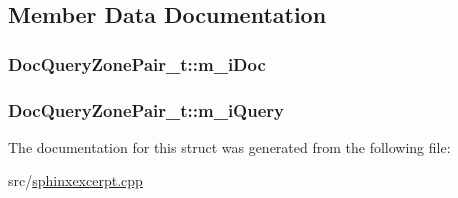 \subsection{Member Data Documentation}
\hypertarget{structDocQueryZonePair__t_aba3efaff10591a3a83afe5f93e248572}{
\subsubsection[{m\-\_\-i\-Doc}]{ Doc\-Query\-Zone\-Pair\-\_\-t\-::m\-\_\-i\-Doc}}\label{structDocQueryZonePair__t_aba3efaff10591a3a83afe5f93e248572}
\hypertarget{structDocQueryZonePair__t_a7dfe0fa04b887c49a057105af857dd15}{
\subsubsection[{m\-\_\-i\-Query}]{ Doc\-Query\-Zone\-Pair\-\_\-t\-::m\-\_\-i\-Query}}\label{structDocQueryZonePair__t_a7dfe0fa04b887c49a057105af857dd15}


The documentation for this struct was generated from the following file\-:\begin{DoxyCompactItemize}
\item 
src/\hyperlink{sphinxexcerpt_8cpp}{sphinxexcerpt.\-cpp}\end{DoxyCompactItemize}
